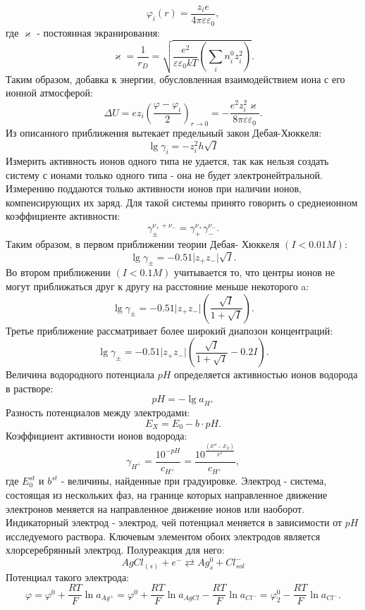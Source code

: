 \documentclass[a4paper, 12pt]{article}
\begin{document}
\[\varphi_i(r) = \frac{z_ie}{4\pi \varepsilon \varepsilon_0},\]
где $\varkappa  $ - постоянная экранирования: 
\[\varkappa   = \frac{1}{r_D} = \sqrt{\frac{e^2}{\varepsilon \varepsilon_0 kT} \left( \sum_i n_i^0z_i^2\right) }.\]
Таким образом, добавка
к энергии, обусловленная взаимодействием иона с его ионной атмосферой: 
\[\Delta U = ez_i\left(\frac{\varphi-\varphi_i}{2}\right)_{r\rightarrow 0} = -\frac{e^2z_i^2\varkappa  }
{8\pi\varepsilon\varepsilon_0}.\]
Из описанного приближения вытекает предельный закон Дебая-Хюккеля:
\begin{equation}
\lg{\gamma_i}=-z_i^2h\sqrt{I}
\end{equation}
Измерить активность ионов одного типа не удается, так как нельзя создать систему с ионами только
одного типа - она не будет электронейтральной. Измерению поддаются только активности ионов при наличии ионов, компенсирующих их заряд. Для такой системы принято говорить о среднеионном
коэффициенте активности: 
\[\gamma_\pm^{\nu_++\nu_-}= \gamma_+^{\nu_+}\gamma_-^{\nu_-}.\]
Таким образом, в первом приближении теории Дебая-
Хюккеля $(I<0.01M)$: 
\[\lg{\gamma_\pm} = -0.51\vert z_+z_-\vert \sqrt{I}.\] 
Во втором приближении $(I<0.1M)$ учитывается то, что центры ионов не могут приближаться друг к другу на расстояние меньше некоторого a: \[\lg{\gamma_\pm} = -0.51\vert z_+z_-\vert\left( \frac{\sqrt{I}}{1+\sqrt{I}}\right).\]
Третье приближение рассматривает более широкий диапозон концентраций: 
\[\lg{\gamma_\pm} = -0.51\vert z_+z_-\vert \left(\frac{\sqrt{I}}{1+\sqrt{I}}-0.2I\right).\]
Величина водородного потенциала $pH$ определяется активностью ионов
водорода в растворе:
\begin{equation}
pH = -\lg{a_{H^+}}
\end{equation}
Разность потенциалов между электродами: 
\[E_X = E_0 - b \cdot pH.\]
Коэффициент активности ионов водорода: 
\[\gamma_{H^+} = \frac{10^{-pH}}{c_{H^+}}
= \frac{10^{\frac{(E^{st}-E_X)}{b^{st}}}}{c_{H^+}},\]
где $E_0^{st}$ и $b^{st}$ - величины, найденные при градуировке. Электрод - система, состоящая из нескольких фаз, на границе которых направленное движение электронов
меняется на направленное движение ионов или наоборот. Индикаторный электрод - электрод, чей
потенциал меняется в зависимости от $pH$ исследуемого раствора. Ключевым элементом обоих электродов является хлорсеребрянный электрод. Полуреакция для него:
\begin{equation}
AgCl_{(s)} + e^- \rightleftarrows  Ag_s^0 + Cl_{sol}^-
\end{equation}
Потенциал такого электрода: 
\[\varphi = \varphi^0 + \frac{RT}{F} \ln{a_{Ag^+}} =\varphi^0 + \frac{RT}{F} \ln{a_{AgCl}} - \frac{RT}{F} \ln{a_{Cl^-}} = \varphi_2^0-\frac{RT}{F} \ln{a_{Cl^-}}.\]
\end{document}
